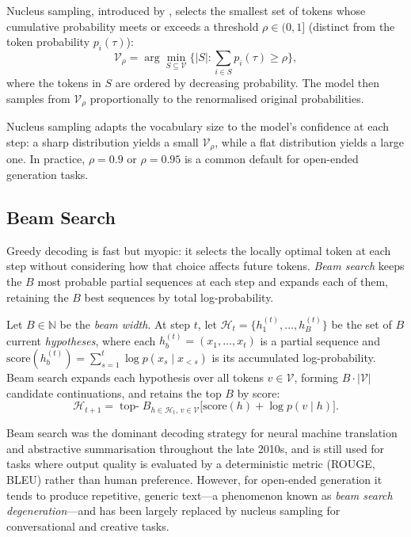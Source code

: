 \begin{deepdive}
\begin{definition}
\label{def:nucleus}
Nucleus sampling, introduced by \citet{holtzman2020curious}, selects the smallest
set of tokens whose cumulative probability meets or exceeds a threshold
$\rho \in (0,1]$ (distinct from the token probability $p_i(\tau)$):
\begin{equation}
  \mathcal{V}_\rho = \arg\min_{S \subseteq \mathcal{V}} \bigl\{ |S| :
    \textstyle\sum_{i \in S} p_i(\tau) \geq \rho \bigr\},
  \label{eq:topp}
\end{equation}
where the tokens in $S$ are ordered by decreasing probability.
The model then samples from $\mathcal{V}_\rho$ proportionally to the renormalised original probabilities.
\end{definition}

Nucleus sampling adapts the vocabulary size to the model's confidence at each step:
a sharp distribution yields a small $\mathcal{V}_\rho$, while a flat distribution
yields a large one.  In practice, $\rho = 0.9$ or $\rho = 0.95$ is a common default for
open-ended generation tasks.

\subsection{Beam Search}
\label{sec:sampling-beam}

Greedy decoding is fast but myopic: it selects the locally optimal token at each step
without considering how that choice affects future tokens.  \emph{Beam search} keeps
the $B$ most probable partial sequences at each step and expands each of them, retaining
the $B$ best sequences by total log-probability.

\begin{definition}
\label{def:beam-search}
Let $B \in \mathbb{N}$ be the \emph{beam width}.  At step $t$, let
$\mathcal{H}_t = \{h_1^{(t)}, \ldots, h_B^{(t)}\}$ be the set of $B$ current
\emph{hypotheses}, where each $h_b^{(t)} = (x_1,\ldots,x_t)$ is a partial sequence
and $\text{score}(h_b^{(t)}) = \sum_{s=1}^t \log p(x_s \mid x_{<s})$ is its
accumulated log-probability.  Beam search expands each hypothesis over all tokens
$v \in \mathcal{V}$, forming $B \cdot |\mathcal{V}|$ candidate continuations, and
retains the top $B$ by score:
\begin{equation}
  \mathcal{H}_{t+1} = \operatorname*{top-}B_{h \in \mathcal{H}_t,\, v \in \mathcal{V}}
    \bigl[ \text{score}(h) + \log p(v \mid h) \bigr].
  \label{eq:beam-search}
\end{equation}
\end{definition}

Beam search was the dominant decoding strategy for neural machine translation and
abstractive summarisation throughout the late 2010s, and is still used for tasks
where output quality is evaluated by a deterministic metric (ROUGE, BLEU) rather than
human preference.  However, for open-ended generation it tends to produce repetitive,
generic text---a phenomenon known as \emph{beam search degeneration}---and has been
largely replaced by nucleus sampling for conversational and creative tasks.

\end{deepdive}

